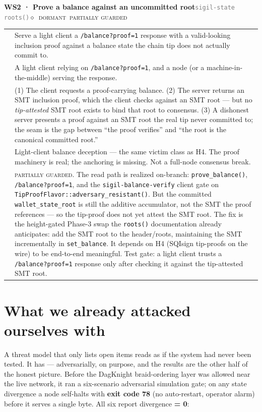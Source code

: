 \documentclass[10pt,a4paper]{article}
\makeatletter
\newcommand{\stD}{\textcolor{sigilviolet}{$\diamond$}~{\scriptsize\textcolor{sigilviolet}{\textsc{dormant}}}}
\newcommand{\measured}[1]{\textcolor{sigilcyan}{\textbf{#1}}}
\newcommand{\svMod}{{\scriptsize\textcolor{sigilblue}{\textsc{moderate}}}}
\newcommand{\mgPartial}{{\scriptsize\textcolor{sigilviolet}{\textsc{partially guarded}}}}
\newcommand{\frow}[2]{{\footnotesize\textcolor{gray}{\textsc{#1}}}\;&\small #2\\}
\newenvironment{atkentry}[5]{%
\begin{tcolorbox}[enhanced,breakable,colback=white,colframe=slate,boxrule=0.6pt,arc=2pt,
  left=8pt,right=8pt,top=6pt,bottom=6pt,
  borderline west={3pt}{0pt}{sigilred!60!slate}]
{\small\textbf{#1 · #2}\hfill{\footnotesize\textcolor{gray}{\texttt{#3}}}\quad#4\quad#5}\\[4pt]
\begin{tabular}{@{}>{\raggedleft\arraybackslash}p{2.1cm}p{12.9cm}@{}}
}{%
\end{tabular}
\end{tcolorbox}\vspace{2pt}}
\makeatother
\begin{document}
\begin{atkentry}{WS2}{Prove a balance against an uncommitted root}{sigil-state roots()}{\svMod}{\stD~\mgPartial}
\frow{goal}{Serve a light client a \texttt{/balance?proof=1} response with a valid-looking
inclusion proof against a balance state the chain tip does not actually commit to.}
\frow{preconditions}{A light client relying on \texttt{/balance?proof=1}, and a node (or a
machine-in-the-middle) serving the response.}
\frow{steps}{(1) The client requests a proof-carrying balance. (2) The server returns an SMT
inclusion proof, which the client checks against an SMT root — but no \emph{tip-attested}
SMT root exists to bind that root to consensus. (3) A dishonest server presents a proof
against an SMT root the real tip never committed to; the seam is the gap between ``the proof
verifies'' and ``the root is the canonical committed root.''}
\frow{buys}{Light-client balance deception — the same victim class as H4. The proof
machinery is real; the anchoring is missing. Not a full-node consensus break.}
\frow{defense}{\mgPartial{}. The read path is realized on-branch: \texttt{prove\_balance()},
\texttt{/balance?proof=1}, and the \texttt{sigil-balance-verify} client gate on
\texttt{TipProofFlavor::adversary\_resistant()}. But the committed \texttt{wallet\_state\_root}
is still the additive accumulator, not the SMT the proof references — so the tip-proof does
not yet attest the SMT root. The fix is the height-gated Phase-3 swap the \texttt{roots()}
documentation already anticipates: add the SMT root to the header/roots, maintaining the SMT
incrementally in \texttt{set\_balance}. It depends on H4 (SQIsign tip-proofs on the wire) to
be end-to-end meaningful. Test gate: a light client trusts a \texttt{/balance?proof=1}
response only after checking it against the tip-attested SMT root.}
\end{atkentry}

\section{What we already attacked ourselves with}
\label{sec:closed}

A threat model that only lists open items reads as if the system had never been tested. It
has — adversarially, on purpose, and the results are the other half of the honest picture.
Before the DagKnight braid-ordering layer was allowed near the live network, it ran a
six-scenario adversarial simulation gate; on any state divergence a node self-halts with
\textbf{exit code 78} (no auto-restart, operator alarm) before it serves a single byte. All
six report divergence \measured{= 0}:
\end{document}
